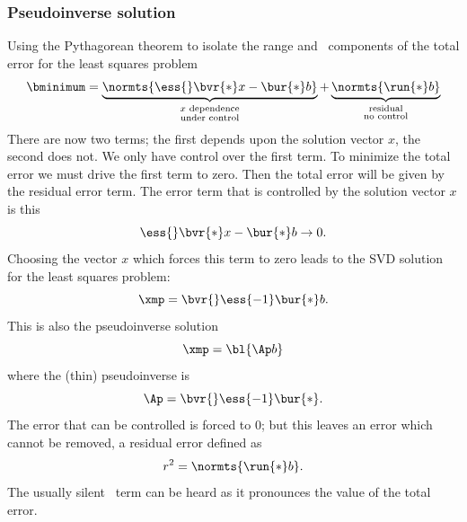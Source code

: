 \subsubsection{Pseudoinverse solution}  %
Using the Pythagorean theorem to isolate the range and \ns \ components of the total error for the least squares problem
\begin{equation*}
  \bminimum = \underbrace{\normts{ \ess{} \bvr{*} x -\bur{*} b  }}_{\substack{x \text{ dependence}\\\text{under control}}} + \underbrace{\normts{ \run{*} b  }}_{\substack{\text{residual}\\\text{no control}}}
\end{equation*}
There are now two terms; the first depends upon the solution vector $x$, the second does not. We only have control over the first term. To minimize the total error we must drive the first term to zero. Then the total error will be given by the residual error term.
The error term that is controlled by the solution vector $x$ is this
\begin{equation}
  \ess{} \bvr{*} x - \bur{*} b \rightarrow 0.
\end{equation}
Choosing the vector $x$ which forces this term to zero  leads to the SVD solution for the least squares problem:
\begin{equation*}
  \xmp = \bvr{} \ess{-1} \bur{*} b.
  \label{eq:svd soln}
\end{equation*}
This is also the pseudoinverse solution
\begin{equation*}
  \xmp = \bl{\Ap b}
\end{equation*}
where the (thin) pseudoinverse is
\begin{equation*}
  \Ap = \bvr{} \ess{-1} \bur{*}.
  \label{eq:mpptsvd}
\end{equation*}
The error that can be controlled is forced to 0; but this leaves an error which cannot be removed, a residual error defined as
  \begin{equation*}   %
    r^{2} = \normts{ \run{*} b  } .
  \end{equation*}
The usually silent \ns \ term can be heard as it pronounces the value of the total error.

